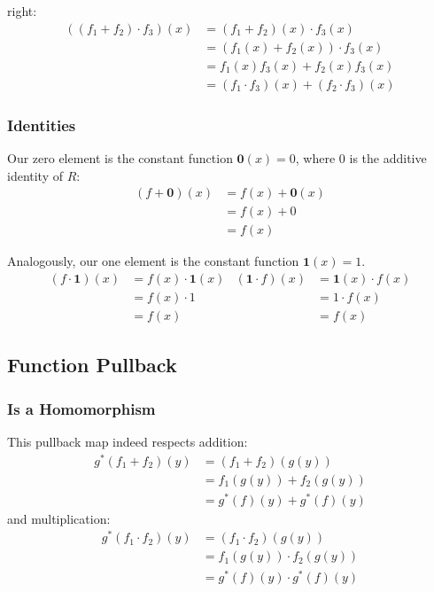 \documentclass[12pt]{article}
\begin{document}
right:
\begin{align*}
  ((f_1 + f_2) \cdot f_3)(x)
   & = (f_1 + f_2)(x) \cdot f_3(x)             \\
   & = (f_1(x) + f_2(x)) \cdot f_3(x)          \\
   & = f_1(x)f_3(x) + f_2(x)f_3(x)             \\
   & = (f_1 \cdot f_3)(x) + (f_2 \cdot f_3)(x)
\end{align*}

\subsubsection{Identities}

Our zero element is the constant function $\mathbf{0}(x)=0$,
where $0$ is the additive identity of $R$:
\begin{align*}
  (f+\mathbf{0})(x)
   & = f(x)+\mathbf{0}(x) \\
   & = f(x)+0             \\
   & = f(x)
\end{align*}

Analogously, our one element is the constant function $\mathbf{1}(x)=1$.
\begin{align*}
  (f \cdot \mathbf{1})(x) & = f(x)\cdot \mathbf{1}(x) & (\mathbf{1} \cdot f)(x) & = \mathbf{1}(x) \cdot f(x) \\
                          & = f(x)\cdot 1             &                         & = 1 \cdot f(x)             \\
                          & = f(x)                    &                         & = f(x)
\end{align*}

\subsection{Function Pullback}

\subsubsection{Is a Homomorphism}

This pullback map indeed respects addition:
\begin{align*}
  g^*(f_1+f_2)(y)
   & = (f_1+f_2)(g(y))       \\
   & = f_1(g(y)) + f_2(g(y)) \\
   & = g^*(f)(y) + g^*(f)(y)
\end{align*}
and multiplication:
\begin{align*}
  g^*(f_1 \cdot f_2)(y)
   & = (f_1 \cdot f_2)(g(y))     \\
   & = f_1(g(y)) \cdot f_2(g(y)) \\
   & = g^*(f)(y) \cdot g^*(f)(y)
\end{align*}
\end{document}
